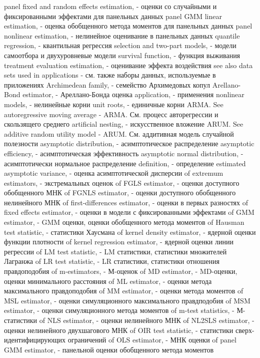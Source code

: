 panel fixed and random effects estimation, - оценки со случайными и фиксированными эффектами для панельных данных
panel GMM linear estimation, - оценка обобщенного метода моментов для панельных данных
panel nonlinear estimation, - нелинейное оценивание в панельных данных
quantile regression, - квантильная регрессия
selection and two-part models, - модели самоотбора и двухуровневые модели
survival function, - функция выживания
treatment evaluation estimation, - оценивание эффекта воздействия
see also data sets used in applications  - см. также наборы данных, используемые в приложениях
Archimedean family, - семейство Архимедовых копул
Arellano-Bond estimator, - Ареллано-Бонда оценка
application, - применения
nonlinear models, - нелинейные корни
unit roots, - единичные корни
ARMA. See autoregressive moving average - ARMA. См. процесс авторегрессии и скользящего среднего
artificial nesting, - искусственное вложение
ARUM. See additive random utility model - ARUM. См. аддитивная модель случайной полезности
asymptotic distribution, - асимптотическое распределение
asymptotic efficiency, - асимптотическая эффективность
asymptotic normal distribution, - асимптотически нормальное распределение
definition, - определение
estimated asymptotic variance, - оценка асимптотической дисперсии
of extremum estimators, - экстремальных оценок
of FGLS estimator, - оценки доступного обобщенного МНК
of FGNLS estimator, - оценки доступного обобщенного нелинейного МНК
of first-differences estimator, - оценки в первых разностях
of fixed effects estimator, - оценки в модели с фиксированными эффектами
of GMM estimator, - GMM оценки, оценки обобщенного метода моментов
of Hausman test statistic, - статистики Хаусмана
of kernel density estimator, - ядерной оценки функции плотности
of kernel regression estimator, - ядерной оценки линии регрессии
of LM test statistic, - LM статистики, статистики множителей Лагранжа
of LR test statistic, - LR статистики, статистики отношения правдоподобия
of m-estimators, - М-оценок
of MD estimator, - MD-оценки, оценки минимального расстояния
of ML estimator, - оценки метода максимального правдоподобия
of MM estimator, - оценки метода моментов
of MSL estimator, - оценки симуляционного максимального правдподобия
of MSM estimator, - оценки симуляционного метода моментов
of m-test statistics, - М-статистики
of NLS estimator, - оценки нелинейного МНК
of NL2SLS estimator, - оценки нелинейного двухшагового МНК
of OIR test statistic, - статистики сверх-идентифицирующих ограничений
of OLS estimator, - МНК оценки
of panel GMM estimator, - панельной оценки обобщенного метода моментов
